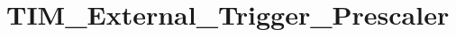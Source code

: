 \hypertarget{group___t_i_m___external___trigger___prescaler}{\section{T\-I\-M\-\_\-\-External\-\_\-\-Trigger\-\_\-\-Prescaler}
\label{group___t_i_m___external___trigger___prescaler}
}
